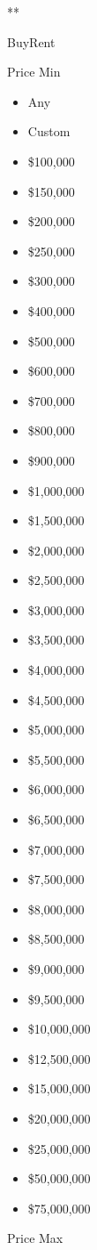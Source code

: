 **

BuyRent

Price Min

\begin{itemize}
\tightlist
\item
  Any
\item
  Custom
\item
  \$100,000
\item
  \$150,000
\item
  \$200,000
\item
  \$250,000
\item
  \$300,000
\item
  \$400,000
\item
  \$500,000
\item
  \$600,000
\item
  \$700,000
\item
  \$800,000
\item
  \$900,000
\item
  \$1,000,000
\item
  \$1,500,000
\item
  \$2,000,000
\item
  \$2,500,000
\item
  \$3,000,000
\item
  \$3,500,000
\item
  \$4,000,000
\item
  \$4,500,000
\item
  \$5,000,000
\item
  \$5,500,000
\item
  \$6,000,000
\item
  \$6,500,000
\item
  \$7,000,000
\item
  \$7,500,000
\item
  \$8,000,000
\item
  \$8,500,000
\item
  \$9,000,000
\item
  \$9,500,000
\item
  \$10,000,000
\item
  \$12,500,000
\item
  \$15,000,000
\item
  \$20,000,000
\item
  \$25,000,000
\item
  \$50,000,000
\item
  \$75,000,000
\end{itemize}

Price Max

